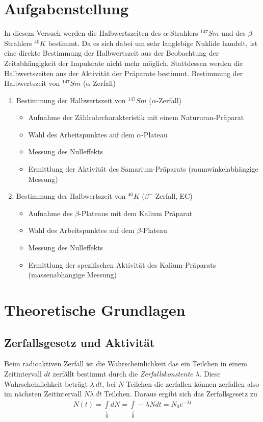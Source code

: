 \documentclass[12pt]{article}
\begin{document}
\section{Aufgabenstellung}
In diesem Versuch werden die Halbwertszeiten des $\alpha$-Strahlers $^{147}Sm$ und des $\beta$-Strahlers $^{40}K$ bestimmt. Da es sich dabei um sehr langlebige Nuklide handelt, ist eine direkte Bestimmung der Halbwertszeit aus der Beobachtung der Zeitabhängigkeit der Impulsrate nicht mehr möglich. Stattdessen werden die Halbwertszeiten aus der Aktivität der Präparate bestimmt. Bestimmung der Halbwertszeit von $^{147}Sm$ ($\alpha$-Zerfall)
\begin{enumerate}
 \item Bestimmung der Halbwertszeit von $^{147}Sm$ ($\alpha$-Zerfall)
\begin{itemize}
 \item Aufnahme der Zählrohrcharakteristik mit einem Natururan-Präparat
 \item Wahl des Arbeitspunktes auf dem $\alpha$-Plateau
 \item Messung des Nulleffekts
 \item Ermittlung der Aktivität des Samarium-Präparats (raumwinkelabhängige Messung)
\end{itemize}
\item Bestimmung der Halbwertszeit von $^{40}K$ ($\beta ^-$-Zerfall, EC)
\begin{itemize}
\item Aufnahme des $\beta$-Plateaus mit dem Kalium Präparat
\item Wahl des Arbeitspunktes auf dem $\beta$-Plateau
\item Messung des Nulleffekts
\item Ermittlung der spezifischen Aktivität des Kalium-Präparats (massenabhängige Messung)
\end{itemize}
\end{enumerate}

\section{Theoretische Grundlagen}
\subsection{Zerfallsgesetz und Aktivität}
Beim radioaktiven Zerfall ist die Wahrscheinlichkeit das ein Teilchen in einem Zeitintervall $dt$ zerfällt bestimmt durch die \textit{Zerfallskonstente} $\lambda$. Diese Wahrscheinlichkeit beträgt $\lambda~dt$, bei $N$ Teilchen die zerfallen können zerfallen also im nächsten Zeitintervall $N\lambda~dt$ Teilchen. Daraus ergibt sich das Zerfallsgesetz zu
\begin{align}
 N(t) = \int \limits_{0} \limits^{t} dN = \int \limits_{0} \limits^{t} - \lambda N dt = N_0 e^{-\lambda t}
\end{align}
\end{document}
